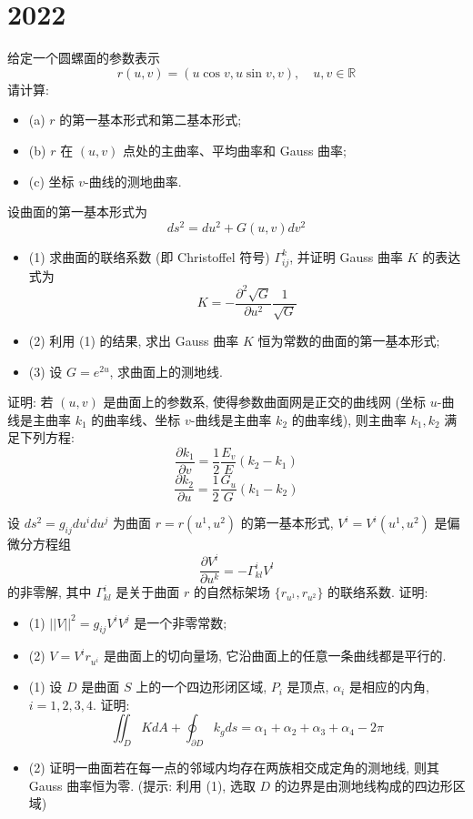 \documentclass[../../main.tex]{subfiles}
\begin{document}
\section{2022}
\begin{problem}
给定一个圆螺面的参数表示
$$r(u, v) = (u \cos v, u \sin v, v), \quad u, v \in \mathbb{R}$$
请计算:
\begin{itemize}
    \item (a) $r$ 的第一基本形式和第二基本形式;
    \item (b) $r$ 在 $(u, v)$ 点处的主曲率、平均曲率和 Gauss 曲率;
    \item (c) 坐标 $v$-曲线的测地曲率.
\end{itemize}
\end{problem}
\begin{problem}
设曲面的第一基本形式为
$$ds^2 = du^2 + G(u, v)dv^2$$
\begin{itemize}
    \item (1) 求曲面的联络系数 (即 Christoffel 符号) $\Gamma_{ij}^k$, 并证明 Gauss 曲率 $K$ 的表达式为
    $$K = -\frac{\partial^2 \sqrt{G}}{\partial u^2} \frac{1}{\sqrt{G}}$$
    \item (2) 利用 (1) 的结果, 求出 Gauss 曲率 $K$ 恒为常数的曲面的第一基本形式;
    \item (3) 设 $G = e^{2u}$, 求曲面上的测地线.
\end{itemize}
\end{problem}
\begin{problem}
证明: 若 $(u, v)$ 是曲面上的参数系, 使得参数曲面网是正交的曲线网 (坐标 $u$-曲线是主曲率 $k_1$ 的曲率线、坐标 $v$-曲线是主曲率 $k_2$ 的曲率线), 则主曲率 $k_1, k_2$ 满足下列方程:
$$\frac{\partial k_1}{\partial v} = \frac{1}{2} \frac{E_v}{E} (k_2 - k_1)$$
$$\frac{\partial k_2}{\partial u} = \frac{1}{2} \frac{G_u}{G} (k_1 - k_2)$$
\end{problem}
\begin{problem}
设 $ds^2 = g_{ij}du^i du^j$ 为曲面 $r = r(u^1, u^2)$ 的第一基本形式, $V^i = V^i(u^1, u^2)$ 是偏微分方程组
$$\frac{\partial V^i}{\partial u^k} = -\Gamma_{kl}^i V^l$$
的非零解, 其中 $\Gamma_{kl}^i$ 是关于曲面 $r$ 的自然标架场 $\{r_{u^1}, r_{u^2}\}$ 的联络系数. 证明:
\begin{itemize}
    \item (1) $||V||^2 = g_{ij}V^iV^j$ 是一个非零常数;
    \item (2) $V = V^i r_{u^i}$ 是曲面上的切向量场, 它沿曲面上的任意一条曲线都是平行的.
\end{itemize}
\end{problem}

\begin{problem}
\begin{itemize}
    \item (1) 设 $D$ 是曲面 $S$ 上的一个四边形闭区域, $P_i$ 是顶点, $\alpha_i$ 是相应的内角, $i=1,2,3,4$. 证明:
    $$\iint_D KdA + \oint_{\partial D} k_g ds = \alpha_1 + \alpha_2 + \alpha_3 + \alpha_4 - 2\pi$$
    \item (2) 证明一曲面若在每一点的邻域内均存在两族相交成定角的测地线, 则其 Gauss 曲率恒为零. (提示: 利用 (1), 选取 $D$ 的边界是由测地线构成的四边形区域)
\end{itemize}
\end{problem}
\end{document}
